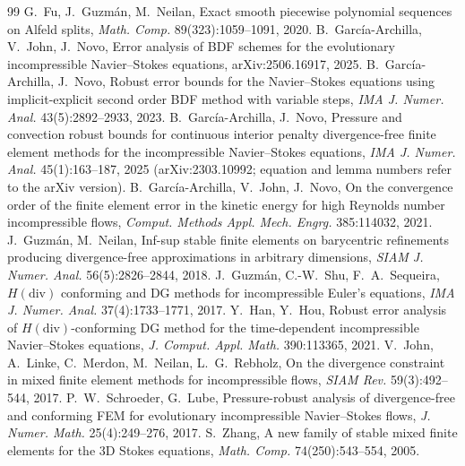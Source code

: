 \documentclass[11pt]{article}
\theoremstyle{remark}\newtheorem{remark}{Remark}
\theoremstyle{plain}
\begin{document}
\begin{thebibliography}{99}
 G.~Fu, J.~Guzm\'an, M.~Neilan, Exact smooth piecewise polynomial sequences on Alfeld splits, \emph{Math. Comp.} 89(323):1059--1091, 2020.
 B.~Garc\'ia-Archilla, V.~John, J.~Novo, Error analysis of BDF schemes for the evolutionary incompressible Navier--Stokes equations, arXiv:2506.16917, 2025.
 B.~Garc\'ia-Archilla, J.~Novo, Robust error bounds for the Navier--Stokes equations using implicit-explicit second order BDF method with variable steps, \emph{IMA J. Numer. Anal.} 43(5):2892--2933, 2023.
 B.~Garc\'ia-Archilla, J.~Novo, Pressure and convection robust bounds for continuous interior penalty divergence-free finite element methods for the incompressible Navier--Stokes equations, \emph{IMA J. Numer. Anal.} 45(1):163--187, 2025 (arXiv:2303.10992; equation and lemma numbers refer to the arXiv version).
 B.~Garc\'ia-Archilla, V.~John, J.~Novo, On the convergence order of the finite element error in the kinetic energy for high Reynolds number incompressible flows, \emph{Comput. Methods Appl. Mech. Engrg.} 385:114032, 2021.
 J.~Guzm\'an, M.~Neilan, Inf-sup stable finite elements on barycentric refinements producing divergence-free approximations in arbitrary dimensions, \emph{SIAM J. Numer. Anal.} 56(5):2826--2844, 2018.
 J.~Guzm\'an, C.-W.~Shu, F.~A.~Sequeira, $H(\mathrm{div})$ conforming and DG methods for incompressible Euler's equations, \emph{IMA J. Numer. Anal.} 37(4):1733--1771, 2017.
 Y.~Han, Y.~Hou, Robust error analysis of $H(\mathrm{div})$-conforming DG method for the time-dependent incompressible Navier--Stokes equations, \emph{J. Comput. Appl. Math.} 390:113365, 2021.
 V.~John, A.~Linke, C.~Merdon, M.~Neilan, L.~G.~Rebholz, On the divergence constraint in mixed finite element methods for incompressible flows, \emph{SIAM Rev.} 59(3):492--544, 2017.
 P.~W.~Schroeder, G.~Lube, Pressure-robust analysis of divergence-free and conforming FEM for evolutionary incompressible Navier--Stokes flows, \emph{J. Numer. Math.} 25(4):249--276, 2017.
 S.~Zhang, A new family of stable mixed finite elements for the 3D Stokes equations, \emph{Math. Comp.} 74(250):543--554, 2005.


\end{thebibliography}
\end{document}
